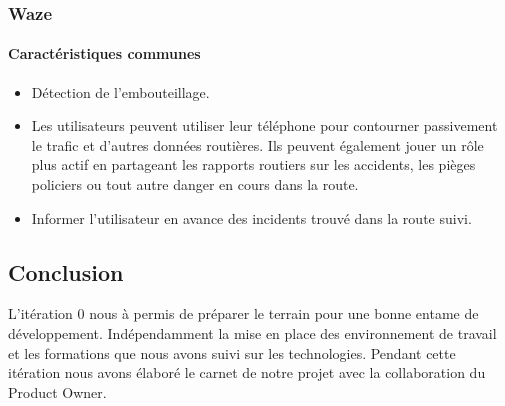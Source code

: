 \subsubsection{Waze}
\paragraph{Caractéristiques communes}
\begin{itemize}
 \item Détection de l'embouteillage.
 \item Les utilisateurs peuvent utiliser leur téléphone pour contourner passivement le trafic 
 et d'autres données routières. Ils peuvent également jouer un rôle plus actif en partageant 
 les rapports routiers sur les accidents, les pièges policiers ou tout autre danger en cours dans la route.
 \item Informer l'utilisateur en avance des incidents trouvé dans la route suivi.
\end{itemize}

\subsection{Conclusion}

L'itération 0 nous à permis de préparer le terrain pour une bonne entame de
développement. Indépendamment la mise en place des environnement de travail et les
formations que nous avons suivi sur les technologies.
Pendant cette itération nous avons élaboré le carnet de notre projet avec la collaboration du Product
Owner.
